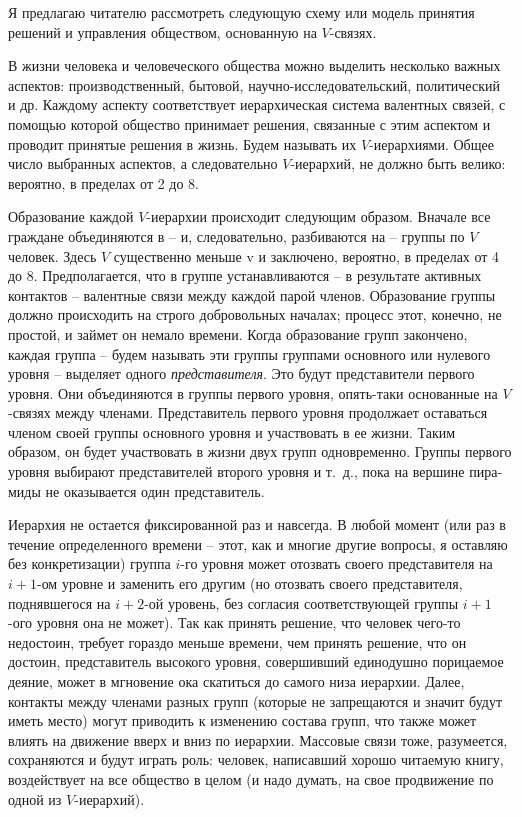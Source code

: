 \documentclass{book}
\begin{document}
Я предлагаю читателю рассмотреть следующую схему или модель принятия решений и управления обществом, основан­ную на $V$-связях.

В жизни человека и человеческого общества можно выделить несколько важных аспектов: производственный, бытовой, научно-исследовательский, политический и др. Каждому аспекту соответствует иерархическая система валентных связей, с по­мощью которой общество принимает решения, связанные с этим аспектом и проводит принятые решения в жизнь. Будем назы­вать их $V$-иерархиями. Общее число выбранных аспектов, а сле­довательно  $V$-иерархий, не должно быть велико: вероятно, в пределах от 2 до 8.

Образование каждой $V$-иерархии происходит следующим образом. Вначале все граждане объединяются в -- и, следова­тельно, разбиваются на -- группы по $V$  человек. Здесь $V$  су­щественно меньше v и  заключено, вероятно, в пределах от 4 до 8. Предполагается, что в группе устанавливаются -- в резуль­тате активных контактов -- валентные связи между каждой па­рой членов. Образование группы должно происходить на строго добровольных началах; процесс этот, конечно, не простой, и займет он немало времени. Когда образование групп закончено, каждая группа -- будем называть эти группы группами основ­ного или нулевого уровня -- выделяет одного \textit{представителя}. Это будут представители первого уровня. Они объединяются в группы первого уровня, опять-таки основанные на $V$-связях между членами. Представитель первого уровня продолжает оставаться членом своей группы основного уровня и участво­вать в ее жизни. Таким образом, он будет участвовать в жизни двух групп одновременно. Группы первого уровня выбирают 
представителей второго уровня и т.~д., пока на вершине пира­миды не оказывается один представитель.

Иерархия не остается фиксированной раз и навсегда. В любой момент (или раз в течение определенного времени -- этот, как и многие другие вопросы, я оставляю без конкретизации) группа $i$-го уровня может отозвать своего представителя на $i+1$-ом уровне и заменить его другим (но отозвать своего представителя, поднявшегося на $i+2$-ой уровень, без согласия соответствующей группы $i+1$-ого уровня она не может). Так как принять решение, что человек чего-то недостоин, требует гораздо меньше времени, чем принять решение, что он достоин, представитель высокого уровня, совершивший единодушно порицаемое деяние, может в мгновение ока скатиться до само­го низа иерархии. Далее, контакты между членами разных групп (которые не запрещаются и значит будут иметь место) могут приводить к изменению состава групп, что также может влиять на движение вверх и вниз по иерархии. Массовые связи тоже, разумеется, сохраняются и будут играть роль: человек, написавший хорошо читаемую книгу, воздействует на все об­щество в целом (и надо 
думать, на свое продвижение по одной из $V$-иерархий).
\end{document}
